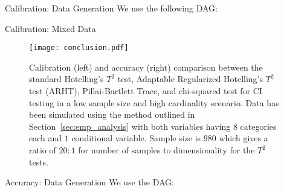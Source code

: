 \documentclass{beamer}
\begin{document}
\begin{frame}{Calibration: Data Generation}
	We use the following DAG:
\begin{center}
\end{center}

\end{frame}

\begin{frame}{Calibration: Mixed Data}
	\begin{figure}[t]
		\centering
		\texttt{[image: conclusion.pdf]}
		\caption{Calibration (left) and accuracy (right) comparison between the
		standard Hotelling's $ T^2 $ test, Adaptable Regularized Hotelling's $
		T^2 $ test (ARHT), Pillai-Bartlett Trace, and chi-squared test for CI
		testing in a low sample size and high cardinality scenario. Data has
		been simulated using the method outlined in
		Section~\ref{sec:emp_analysis} with both variables having $ 8 $
		categories each and $ 1 $ conditional variable. Sample size is $ 980 $
		which gives a ratio of $ 20:1 $ for number of samples to dimensionality
		for the $T^2$ tests.}
		\label{fig:conc_compare}
	\end{figure}
\end{frame}


\begin{frame}{Accuracy: Data Generation}
	We use the DAG:

\begin{center}
\end{center}
\end{frame}
\end{document}
